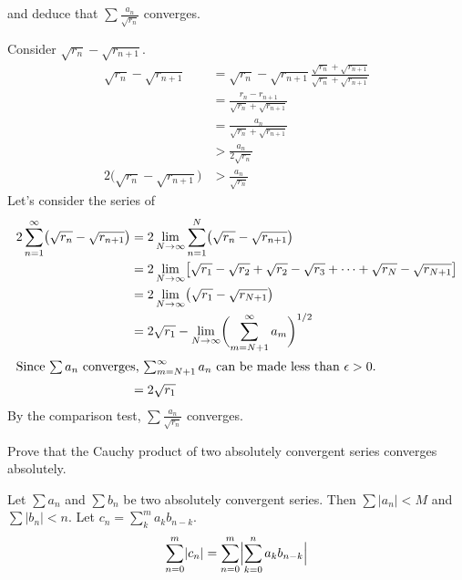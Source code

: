 \begin{exercise}
\begin{exercise}[label = (\alph*)]
\[    \]
    and deduce that \(\sum\frac{a_n}{\sqrt{r_n}}\) converges.
    \par\smallskip
    Consider \(\sqrt{r_n} - \sqrt{r_{n + 1}}\).
    \begin{align*}
      \sqrt{r_n} - \sqrt{r_{n + 1}}
      & = \sqrt{r_n} - \sqrt{r_{n + 1}}
        \frac{\sqrt{r_n} + \sqrt{r_{n + 1}}}{\sqrt{r_n} + \sqrt{r_{n + 1}}}\\
      & = \frac{r_n - r_{n + 1}}{\sqrt{r_n} + \sqrt{r_{n + 1}}}\\
      & = \frac{a_n}{\sqrt{r_n} + \sqrt{r_{n + 1}}}\\
      & > \frac{a_n}{2\sqrt{r_n}}\\
      2\bigl(\sqrt{r_n} - \sqrt{r_{n + 1}}\bigr) & > \frac{a_n}{\sqrt{r_n}}
    \end{align*}
    Let's consider the series of
    \begin{align*}
      2\sum_{n = 1}^{\infty}\bigl(\sqrt{r_n} - \sqrt{r_{n + 1}}\bigr)
      & = 2\lim_{N\to\infty}\sum_{n = 1}^N
        \bigl(\sqrt{r_n} - \sqrt{r_{n + 1}}\bigr)\\
      & = 2\lim_{N\to\infty}\bigl[\sqrt{r_1} - \sqrt{r_2} + \sqrt{r_2} -
        \sqrt{r_3} + \cdots + \sqrt{r_N} - \sqrt{r_{N + 1}}\bigr]\\
      & = 2\lim_{N\to\infty}\bigl(\sqrt{r_1} - \sqrt{r_{N + 1}}\bigr)\\
      & = 2\sqrt{r_1} - \lim_{N\to\infty}
        \biggl(\sum_{m = N + 1}^{\infty}a_m\biggr)^{1/2}\\
      \intertext{Since \(\sum a_n\) converges, \(\sum_{m = N + 1}^{\infty}a_n\)
      can be made less than \(\epsilon > 0\).}
      & = 2\sqrt{r_1}
    \end{align*}
    By the comparison test, \(\sum\frac{a_n}{\sqrt{r_n}}\) converges.
  \end{exercise}
\item
  Prove that the Cauchy product of two absolutely convergent series converges
  absolutely.
  \par\smallskip
  Let \(\sum a_n\) and \(\sum b_n\) be two absolutely convergent series.
  Then \(\sum\lvert a_n\rvert < M\) and \(\sum\lvert b_n\rvert < n\).
  Let \(c_n = \sum_k^ma_kb_{n - k}\).
  \begin{align*}
    \sum_{n = 0}^m\lvert c_n\rvert
    & = \sum_{n = 0}^m\Bigl\lvert\sum_{k = 0}^n a_kb_{n - k}\Bigr\rvert\\

\end{align*}
\end{exercise}
